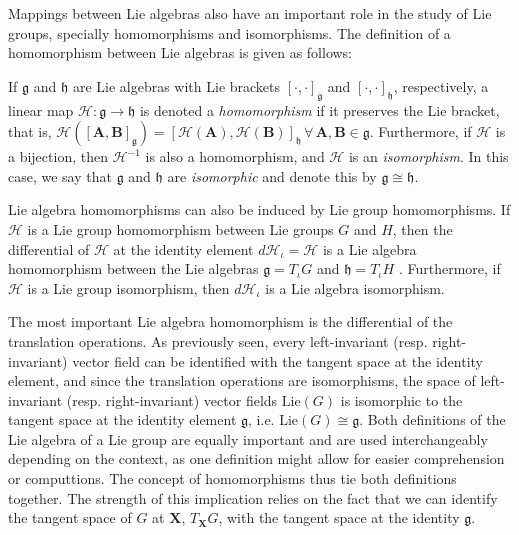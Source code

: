 Mappings between Lie algebras also have an important role in the study of Lie groups, specially homomorphisms and isomorphisms. The definition of a homomorphism between Lie algebras is given as follows:
\begin{definition}
    If $\mathfrak{g}$ and $\mathfrak{h}$ are Lie algebras with Lie brackets $[\cdot, \cdot]_\mathfrak{g}$ and $[\cdot, \cdot]_\mathfrak{h}$, respectively, a linear map $\mathscr{H}:\mathfrak{g}\to\mathfrak{h}$ is denoted a \emph{homomorphism} if it preserves the Lie bracket, that is, $\mathscr{H}([\mathbf{A}, \mathbf{B}]_\mathfrak{g}) = [\mathscr{H}(\mathbf{A}), \mathscr{H}(\mathbf{B})]_\mathfrak{h}\,\forall\, \mathbf{A},\mathbf{B}\in\mathfrak{g}$. Furthermore, if $\mathscr{H}$ is a bijection, then $\mathscr{H}^{-1}$ is also a homomorphism, and $\mathscr{H}$ is an \emph{isomorphism}. In this case, we say that $\mathfrak{g}$ and $\mathfrak{h}$ are \emph{isomorphic} and denote this by $\mathfrak{g}\cong\mathfrak{h}$.
\end{definition}
Lie algebra homomorphisms can also be induced by Lie group homomorphisms. If $\mathcal{H}$ is a Lie group homomorphism between Lie groups $G$ and $H$, then the differential of $\mathcal{H}$ at the identity element $d\mathcal{H}_\iota=\mathscr{H}$ is a Lie algebra homomorphism between the Lie algebras $\mathfrak{g}=T_\iota G$ and $\mathfrak{h}=T_\iota H$ \citep[p. 41]{Duistermaat2012}. Furthermore, if $\mathcal{H}$ is a Lie group isomorphism, then $d\mathcal{H}_\iota$ is a Lie algebra isomorphism.

The most important Lie algebra homomorphism is the differential of the translation operations. As previously seen, every left-invariant (resp. right-invariant) vector field can be identified with the tangent space at the identity element, and since the translation operations are isomorphisms, the space of left-invariant (resp. right-invariant) vector fields $\text{Lie}(G)$ is isomorphic to the tangent space at the identity element $\mathfrak{g}$, i.e. $\text{Lie}(G)\cong\mathfrak{g}$. Both definitions of the Lie algebra of a Lie group are equally important and are used interchangeably depending on the context, as one definition might allow for easier comprehension or computtions. The concept of homomorphisms thus tie both definitions together. The strength of this implication relies on the fact that we can identify the tangent space of $G$ at $\mathbf{X}$, $T_\mathbf{X}G$, with the tangent space at the identity $\mathfrak{g}$.
